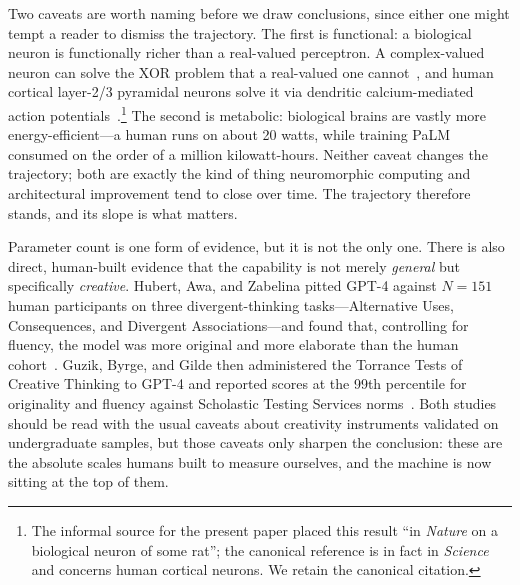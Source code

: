 \documentclass[11pt]{article}
\begin{document}
Two caveats are worth naming before we draw conclusions, since either one might tempt a reader to dismiss the trajectory. The first is functional: a biological neuron is functionally richer than a real-valued perceptron. A complex-valued neuron can solve the XOR problem that a real-valued one cannot~\cite{aizenberg2007mlmvn}, and human cortical layer-2/3 pyramidal neurons solve it via dendritic calcium-mediated action potentials~\cite{gidon2020dendritic}.\footnote{The informal source for the present paper placed this result ``in \emph{Nature} on a biological neuron of some rat''; the canonical reference is in fact in \emph{Science} and concerns human cortical neurons. We retain the canonical citation.} The second is metabolic: biological brains are vastly more energy-efficient---a human runs on about 20 watts, while training PaLM consumed on the order of a million kilowatt-hours. Neither caveat changes the trajectory; both are exactly the kind of thing neuromorphic computing and architectural improvement tend to close over time. The trajectory therefore stands, and its slope is what matters.

Parameter count is one form of evidence, but it is not the only one. There is also direct, human-built evidence that the capability is not merely \emph{general} but specifically \emph{creative}. Hubert, Awa, and Zabelina pitted GPT-4 against $N=151$ human participants on three divergent-thinking tasks---Alternative Uses, Consequences, and Divergent Associations---and found that, controlling for fluency, the model was more original and more elaborate than the human cohort~\cite{hubert2024creative}. Guzik, Byrge, and Gilde then administered the Torrance Tests of Creative Thinking to GPT-4 and reported scores at the 99th percentile for originality and fluency against Scholastic Testing Services norms~\cite{guzik2023torrance}. Both studies should be read with the usual caveats about creativity instruments validated on undergraduate samples, but those caveats only sharpen the conclusion: these are the absolute scales humans built to measure ourselves, and the machine is now sitting at the top of them.
\end{document}
